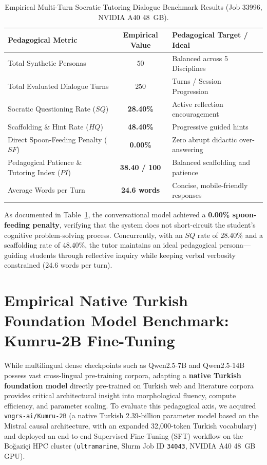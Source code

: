 \documentclass[a4paper,12pt]{report}
\begin{document}
\begin{table}[htbp]
\centering
\caption{Empirical Multi-Turn Socratic Tutoring Dialogue Benchmark Results (Job 33996, NVIDIA A40 48~GB).}
\label{tab:socratic_benchmark}
\footnotesize\setlength{\tabcolsep}{3pt}
\begin{tabularx}{\textwidth}{>{\RaggedRight\arraybackslash}X c >{\RaggedRight\arraybackslash}X}
\toprule
\textbf{Pedagogical Metric} & \textbf{Empirical Value} & \textbf{Pedagogical Target / Ideal} \\
\midrule
Total Synthetic Personas & $50$ & Balanced across 5 Disciplines \\
Total Evaluated Dialogue Turns & $250$ & 5 Turns / Session Progression \\
Socratic Questioning Rate ($SQ$) & \textbf{28.40\%} & Active reflection encouragement \\
Scaffolding \& Hint Rate ($HQ$) & \textbf{48.40\%} & Progressive guided hints \\
Direct Spoon-Feeding Penalty ($SF$) & \textbf{0.00\%} & Zero abrupt didactic over-answering \\
Pedagogical Patience \& Tutoring Index ($PI$) & \textbf{38.40 / 100} & Balanced scaffolding and patience \\
Average Words per Turn & \textbf{24.6 words} & Concise, mobile-friendly responses \\
\bottomrule
\end{tabularx}
\end{table}

As documented in Table~\ref{tab:socratic_benchmark}, the conversational model achieved a \textbf{0.00\% spoon-feeding penalty}, verifying that the system does not short-circuit the student's cognitive problem-solving process. Concurrently, with an $SQ$ rate of $28.40\%$ and a scaffolding rate of $48.40\%$, the tutor maintains an ideal pedagogical persona---guiding students through reflective inquiry while keeping verbal verbosity constrained ($24.6$ words per turn).



\section{Empirical Native Turkish Foundation Model Benchmark: Kumru-2B Fine-Tuning}
\label{sec:kumru_2b_benchmark}
While multilingual dense checkpoints such as Qwen2.5-7B and Qwen2.5-14B possess vast cross-lingual pre-training corpora, adapting a \textbf{native Turkish foundation model} directly pre-trained on Turkish web and literature corpora provides critical architectural insight into morphological fluency, compute efficiency, and parameter scaling. To evaluate this pedagogical axis, we acquired \texttt{vngrs-ai/Kumru-2B} (a native Turkish 2.39-billion parameter model based on the Mistral causal architecture, with an expanded 32,000-token Turkish vocabulary) and deployed an end-to-end Supervised Fine-Tuning (SFT) workflow on the Bo\u{g}azi\c{c}i HPC cluster (\texttt{ultramarine}, Slurm Job ID \texttt{34043}, NVIDIA A40 48~GB GPU).
\end{document}
